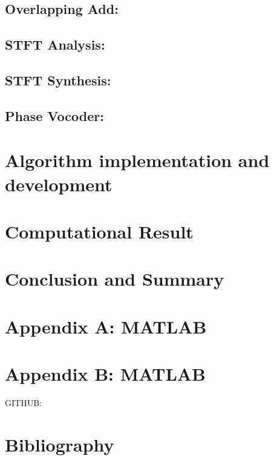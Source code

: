 \documentclass[11pt]{article}
\begin{document}
\subsection{Overlapping Add:}
\subsection{STFT Analysis: }
\subsection{STFT Synthesis:}
\subsection{Phase Vocoder: }






\section{Algorithm implementation and development }
\section{Computational Result}
\section{Conclusion and Summary}
\section{Appendix A: MATLAB  }
\section{Appendix B: MATLAB }
GITHUB: 
\section{Bibliography}
\end{document}
